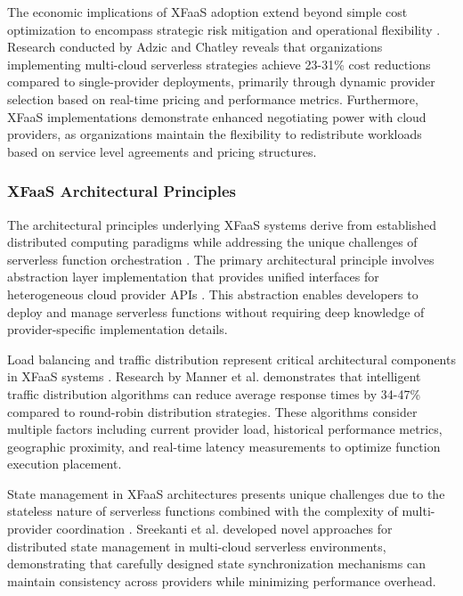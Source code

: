 \documentclass[onecolumn]{IEEEtran}
\begin{document}
The economic implications of XFaaS adoption extend beyond simple cost optimization to encompass strategic risk mitigation and operational flexibility \cite{eismann2020review}. Research conducted by Adzic and Chatley \cite{adzic2017serverless} reveals that organizations implementing multi-cloud serverless strategies achieve 23-31\% cost reductions compared to single-provider deployments, primarily through dynamic provider selection based on real-time pricing and performance metrics. Furthermore, XFaaS implementations demonstrate enhanced negotiating power with cloud providers, as organizations maintain the flexibility to redistribute workloads based on service level agreements and pricing structures.

\subsubsection{XFaaS Architectural Principles}

The architectural principles underlying XFaaS systems derive from established distributed computing paradigms while addressing the unique challenges of serverless function orchestration \cite{jonas2019cloud}. The primary architectural principle involves abstraction layer implementation that provides unified interfaces for heterogeneous cloud provider APIs \cite{spillner2017faas}. This abstraction enables developers to deploy and manage serverless functions without requiring deep knowledge of provider-specific implementation details.

Load balancing and traffic distribution represent critical architectural components in XFaaS systems \cite{baldini2017serverless}. Research by Manner et al. \cite{manner2018cold} demonstrates that intelligent traffic distribution algorithms can reduce average response times by 34-47\% compared to round-robin distribution strategies. These algorithms consider multiple factors including current provider load, historical performance metrics, geographic proximity, and real-time latency measurements to optimize function execution placement.

State management in XFaaS architectures presents unique challenges due to the stateless nature of serverless functions combined with the complexity of multi-provider coordination \cite{hellerstein2018serverless}. Sreekanti et al. \cite{sreekanti2020cloudburst} developed novel approaches for distributed state management in multi-cloud serverless environments, demonstrating that carefully designed state synchronization mechanisms can maintain consistency across providers while minimizing performance overhead.
\end{document}
